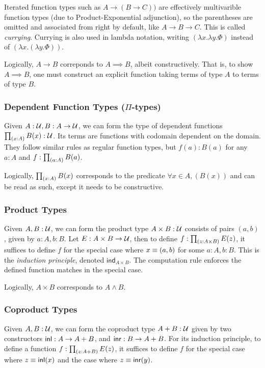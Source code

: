 Iterated function types such as $A \to (B \to C))$ are effectively multivarible function types (due to Product-Exponential adjunction),
so the parentheses are omitted and associated from right by default, like $A \to B \to C$. This is called \emph{currying}.
Currying is also used in lambda notation, writing $(\lambda x.\lambda y.\Phi)$ instead of $(\lambda x.(\lambda y.\Phi))$.

Logically, $A \to B$ correponds to $A \implies B$, albeit constructively. That is, to show $A \implies B$, one must construct
an explicit function taking terms of type $A$ to terms of type $B$.

\subsubsection{Dependent Function Types ($\Pi$-types)}
Given $A : \mathcal{U}, B : A \to \mathcal{U}$, we can form the type of dependent functions $\prod_{(x:A)}{B}(x) : \mathcal{U}$. Its terms are functions with
codomain dependent on the domain. They follow similar rules as regular function types, but $f(a) : B(a)$
for any $a : A$ and  $f : \prod_{(a:A)}{B(a)}$.

Logically, $\prod_{(x:A)}{B(x)}$ corresponds to the predicate $\forall x \in A, (B(x))$ and can be read as such, except it needs to be constructive. 

\subsubsection{Product Types}
Given $A, B : \mathcal{U}$, we can form the product type $A \times B : \mathcal{U}$ consists of pairs $(a, b)$, given by $a : A, b : B$. 
Let $E : A \times B \to \mathcal{U}$, then to define $f : \prod_{(z:A\times B)}{E(z)}$, it suffices to define $f$
for the special case where $x \equiv (a,b)$ for some $a : A, b : B$. This is the \textit{induction principle}, denoted
$\mathsf{ind}_{A\times B}$. The computation rule enforces the defined function matches in the special case.

Logically, $A \times B$ corresponds to $A \land B$.

\subsubsection{Coproduct Types}
Given $A, B : \mathcal{U}$, we can form the coproduct type $A + B : \mathcal{U}$ given by two constructors $\mathsf{inl} : A \to A + B$, and $\mathsf{inr} : B \to A + B$.
For its induction principle, to define a function $f : \prod_{(z : A + B)}{E}(z)$, it suffices to define $f$ for the 
special case where $z \equiv \mathsf{inl} (x)$ and the case where $z \equiv \mathsf{inr} (y)$.


